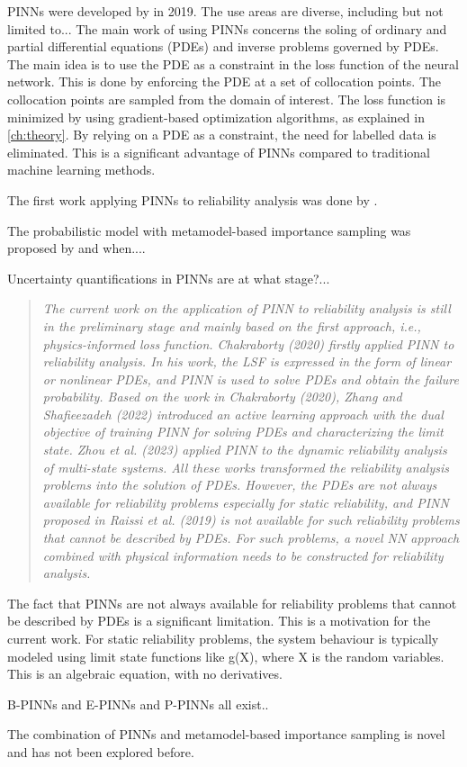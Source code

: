 PINNs were developed by \cite{raissi2019pinns} in 2019. The use areas are diverse, including but not limited to...
The main work of using PINNs concerns the soling of ordinary and partial differential equations (PDEs) and inverse problems governed by PDEs. The main idea is to use the PDE as a constraint in the loss function of the neural network. This is done by enforcing the PDE at a set of collocation points. The collocation points are sampled from the domain of interest. The loss function is minimized by using gradient-based optimization algorithms, as explained in \ref{ch:theory}. By relying on a PDE as a constraint, the need for labelled data is eliminated. This is a significant advantage of PINNs compared to traditional machine learning methods. 

The first work applying PINNs to reliability analysis was done by \citet{chakraborty2020simulationfreereliabilityanalysis}. 

The probabilistic model with metamodel-based importance sampling was proposed by and when....

Uncertainty quantifications in PINNs are at what stage?...
\begin{quotation}
    \textit{The current work on the application of PINN to reliability analysis is still in the preliminary stage and mainly based on the first approach, i.e., physics-informed loss function. Chakraborty (2020) firstly applied PINN to reliability analysis. In his work, the LSF is expressed in the form of linear or nonlinear PDEs, and PINN is used to solve PDEs and obtain the failure probability. Based on the work in Chakraborty (2020), Zhang and Shafieezadeh (2022) introduced an active learning approach with the dual objective of training PINN for solving PDEs and characterizing the limit state. Zhou et al. (2023) applied PINN to the dynamic reliability analysis of multi-state systems. All these works transformed the reliability analysis problems into the solution of PDEs. However, the PDEs are not always available for reliability problems especially for static reliability, and PINN proposed in Raissi et al. (2019) is not available for such reliability problems that cannot be described by PDEs. For such problems, a novel NN approach combined with physical information needs to be constructed for reliability analysis.} 
    \cite{bai2023reliability}
\end{quotation}

The fact that PINNs are not always available for reliability problems that cannot be described by PDEs is a significant limitation. This is a motivation for the current work. For static reliability problems, the system behaviour is typically modeled using limit state functions like g(X), where X is the random variables. This is an algebraic equation, with no derivatives. 



B-PINNs and E-PINNs and P-PINNs all exist..

The combination of PINNs and metamodel-based importance sampling is novel and has not been explored before. 

